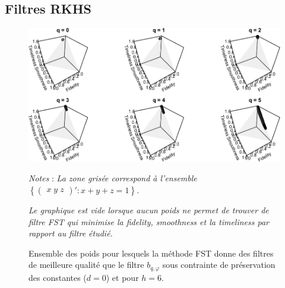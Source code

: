 \documentclass[
  11pt,
  french,
  a4paper]{article}
\newcommand\1{\mathds{1}}
\begin{document}
\newpage

\hypertarget{filtres-rkhs}{%
\subsection{Filtres RKHS}\label{filtres-rkhs}}

\begin{figure}[H]

{\centering \includegraphics{img/bookdown/pdf/rkhs6d0-1} 

}

\caption[Ensemble des poids pour lesquels la méthode FST donne des filtres de meilleure qualité que le filtre \(b_{q,\varphi}\) sous contrainte de préservation des constantes (\(d=0\)) et pour \(h=6\)]{Ensemble des poids pour lesquels la méthode FST donne des filtres de meilleure qualité que le filtre \(b_{q,\varphi}\) sous contrainte de préservation des constantes (\(d=0\)) et pour \(h=6\).}\label{fig:rkhs6d0}

\footnotesize


\emph{Notes} : \emph{La zone grisée correspond à l'ensemble \(\left\{\begin{pmatrix}x \; y \; z \end{pmatrix}' : x+y+z=1\right\}\).}

\emph{Le graphique est vide lorsque aucun poids ne permet de trouver de filtre FST qui minimise la \emph{fidelity}, \emph{smoothness} et la \emph{timeliness} par rapport au filtre étudié.}
\normalsize\end{figure}
\end{document}

